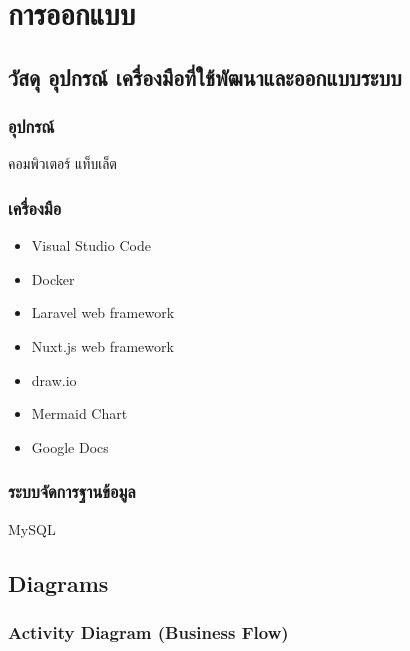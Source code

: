 \section{การออกแบบ}

\subsection{วัสดุ อุปกรณ์ เครื่องมือที่ใช้พัฒนาและออกแบบระบบ}

\subsubsection{อุปกรณ์}

คอมพิวเตอร์ แท็บเล็ต

\subsubsection{เครื่องมือ}

\begin{itemize}
    \item Visual Studio Code
    \item Docker
    \item Laravel web framework
    \item Nuxt.js web framework
    \item draw.io
    \item Mermaid Chart
    \item Google Docs
\end{itemize}

\subsubsection{ระบบจัดการฐานข้อมูล}

MySQL

\subsection{Diagrams}

\subsubsection{Activity Diagram (Business Flow)}

